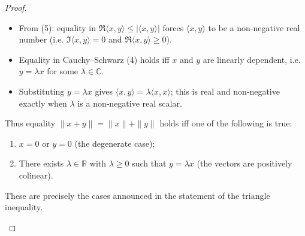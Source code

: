 \begin{proof}
\begin{enumerate}
\begin{itemize}
\item From (5): equality in \(\Re\langle x,y\rangle\le |\langle x,y\rangle|\) forces \(\langle x,y\rangle\) to be a non‑negative real number (i.e. \(\Im\langle x,y\rangle=0\) and \(\Re\langle x,y\rangle\ge0\)).
\item Equality in Cauchy–Schwarz (4) holds iff \(x\) and \(y\) are linearly dependent, i.e. \(y=\lambda x\) for some \(\lambda\in\mathbb{C}\).
\item Substituting \(y=\lambda x\) gives \(\langle x,y\rangle=\lambda\langle x,x\rangle\); this is real and non‑negative exactly when \(\lambda\) is a non‑negative real scalar.
\end{itemize}
Thus equality \(\|x+y\|=\|x\|+\|y\|\) holds iff one of the following is true:

\begin{enumerate}
\item \(x=0\) or \(y=0\) (the degenerate case);
\item There exists \(\lambda\in\mathbb{R}\) with \(\lambda\ge0\) such that \(y=\lambda x\) (the vectors are positively colinear).
\end{enumerate}
These are precisely the cases announced in the statement of the triangle inequality.
\end{enumerate}
\end{proof}